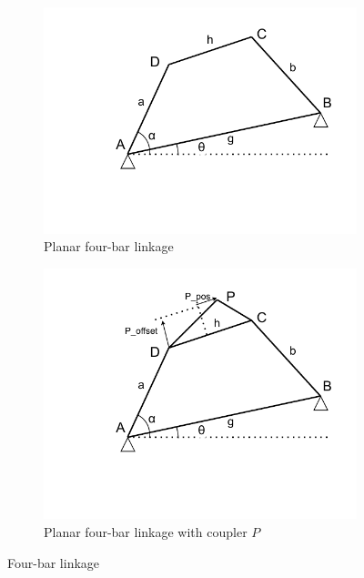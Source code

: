 \documentclass{article}
\begin{document}
\begin{figure}[h]
	\centering
	\begin{subfigure}{0.49\textwidth}
		\centering
	    \includegraphics[width=\linewidth]{./figures/four-bar_linkage.pdf}
	    \caption{Planar four-bar linkage}
	    \label{fig:linkage-1}
	\end{subfigure}
	\hfill
	\begin{subfigure}{0.49\textwidth}
		\centering
		\includegraphics[width=\linewidth]{./figures/four-bar_linkage+coupler.pdf}
		\caption{Planar four-bar linkage with coupler $P$}
		\label{fig:linkage-2}
	\end{subfigure}
	\caption{Four-bar linkage}
\end{figure}
\end{document}
